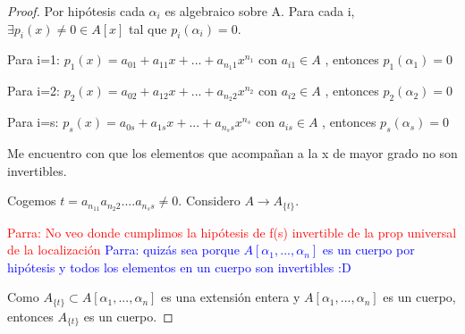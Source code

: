 \begin{proof}
Por hipótesis cada $\alpha_i$ es algebraico sobre A. Para cada i, $\exists p_i(x) \neq 0 \in A[x]$ tal que $p_i(\alpha_i)=0$.

Para i=1: $p_1(x)=a_{01}+a_{11}x+...+a_{n_1 1}x^{n_1}$ con $a_{i1}\in A$ , entonces $p_1(\alpha_1)=0$

Para i=2: $p_2(x)=a_{02}+a_{12}x+...+a_{n_2 2}x^{n_2}$ con $a_{i2}\in A$ , entonces $p_2(\alpha_2)=0$

Para i=s: $p_s(x)=a_{0s}+a_{1s}x+...+a_{n_s s}x^{n_s}$ con $a_{is}\in A$ , entonces $p_s(\alpha_s)=0$

Me encuentro con que los elementos que acompañan a la x de mayor grado no son invertibles.

Cogemos $t=a_{n_11} a_{n_2 2}....a_{n_s s}\neq 0$. Considero $A \rightarrow A_{\{t\}}$.


\textcolor{red}{Parra: No veo donde cumplimos la hipótesis de f(s) invertible de la prop universal de la localización} \textcolor{blue}{Parra: quizás sea porque $A[\alpha_1,...,\alpha_n]$ es un cuerpo por hipótesis y todos los elementos en un cuerpo son invertibles :D}

Como $A_{\{t\}} \subset A[\alpha_1,...,\alpha_n]$ es una extensión entera y $A[\alpha_1,...,\alpha_n]$ es un cuerpo, entonces $A_{\{t\}}$ es un cuerpo.
\end{proof}

